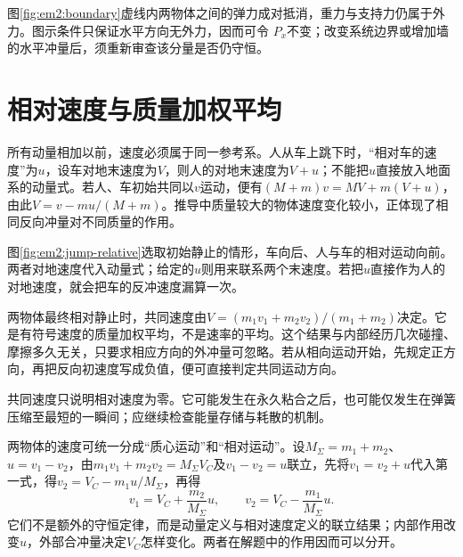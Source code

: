 图\ref{fig:em2:boundary}虚线内两物体之间的弹力成对抵消，重力与支持力仍属于外力。图示条件只保证水平方向无外力，因而可令 $P_x$不变；改变系统边界或增加墙的水平冲量后，须重新审查该分量是否仍守恒。

\section{相对速度与质量加权平均}

所有动量相加以前，速度必须属于同一参考系。人从车上跳下时，“相对车的速度”为$u$，设车对地末速度为$V$，则人的对地末速度为$V+u$；不能把$u$直接放入地面系的动量式。若人、车初始共同以$v$运动，便有$(M+m)v=MV+m(V+u)$，由此$V=v-mu/(M+m)$。推导中质量较大的物体速度变化较小，正体现了相同反向冲量对不同质量的作用。

图\ref{fig:em2:jump-relative}选取初始静止的情形，车向后、人与车的相对运动向前。两者对地速度代入动量式；给定的$u$则用来联系两个末速度。若把$u$直接作为人的对地速度，就会把车的反冲速度漏算一次。


两物体最终相对静止时，共同速度由$V=(m_1v_1+m_2v_2)/(m_1+m_2)$决定。它是有符号速度的质量加权平均，不是速率的平均。这个结果与内部经历几次碰撞、摩擦多久无关，只要求相应方向的外冲量可忽略。若从相向运动开始，先规定正方向，再把反向初速度写成负值，便可直接判定共同运动方向。

共同速度只说明相对速度为零。它可能发生在永久粘合之后，也可能仅发生在弹簧压缩至最短的一瞬间；应继续检查能量存储与耗散的机制。

两物体的速度可统一分成“质心运动”和“相对运动”。设$M_\Sigma=m_1+m_2$、$u=v_1-v_2$，由$m_1v_1+m_2v_2=M_\Sigma V_C$及$v_1-v_2=u$联立，先将$v_1=v_2+u$代入第一式，得$v_2=V_C-m_1u/M_\Sigma$，再得
\[v_1=V_C+\frac{m_2}{M_\Sigma}u,\qquad v_2=V_C-\frac{m_1}{M_\Sigma}u.\]
它们不是额外的守恒定律，而是动量定义与相对速度定义的联立结果；内部作用改变$u$，外部合冲量决定$V_C$怎样变化。两者在解题中的作用因而可以分开。

